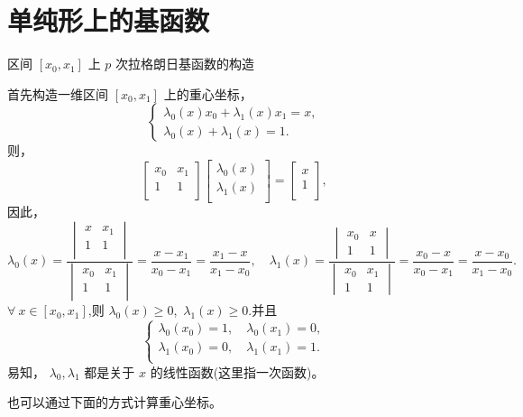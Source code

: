 \documentclass[12pt,a4paper]{article}
\begin{document}
\section{单纯形上的基函数}
区间 $[x_0,x_1]$ 上 $p$ 次拉格朗日基函数的构造

首先构造一维区间 $[x_0,x_1]$ 上的重心坐标，
$$
\begin{cases}
\lambda _0(x)x_0+\lambda _1(x)x_1=x,\\
\lambda _0(x)+\lambda _1(x)=1.
\end{cases}
$$
则，
$$
\begin{bmatrix}
x_0 & x_1\\
1 & 1\\
\end{bmatrix}
\begin{bmatrix}
\lambda _0(x)\\
\lambda _1(x)\\
\end{bmatrix}=\begin{bmatrix}
x\\
1\\
\end{bmatrix},
$$
因此，
$$
\lambda _0(x)=\frac{\begin{vmatrix}
x & x_1 \\
1 & 1 \\
\end{vmatrix}}{\begin{vmatrix}
x_0 & x_1 \\
1 & 1 \\
\end{vmatrix}}=\frac{x-x_1}{x_0-x_1}=\frac{x_1-x}{x_1-x_0},
\quad\lambda _1(x)=\frac{\begin{vmatrix}
x_0 & x \\
1 & 1
\end{vmatrix}}{\begin{vmatrix}
x_0 & x_1 \\
1 & 1
\end{vmatrix}}=\frac{x_0-x}{x_0-x_1}=\frac{x-x_0}{x_1-x_0}.
$$
$\forall ~x\in [x_0,x_1]$,则 $\lambda _0(x)\ge 0$,~$\lambda _1(x)\ge 0$.并且
$$
\begin{cases}
\lambda _0 (x_0)=1,\quad\lambda _0 (x_1)=0,\\
\lambda _1 (x_0)=0,\quad\lambda _1 (x_1)=1.\\
\end{cases}
$$
易知， $\lambda_0, \lambda_1$ 都是关于 $x$ 的线性函数(这里指一次函数)。

也可以通过下面的方式计算重心坐标。
\end{document}
